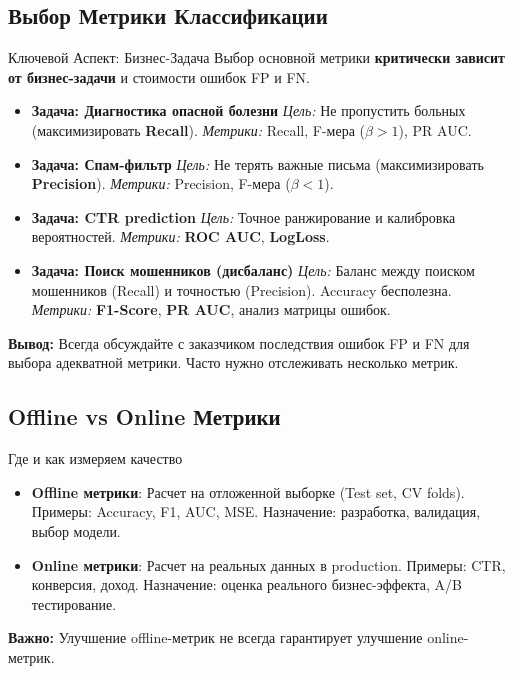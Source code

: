 \subsection{Выбор Метрики Классификации}
\begin{alerttextbox}{Ключевой Аспект: Бизнес-Задача}
    Выбор основной метрики \textbf{критически зависит от бизнес-задачи} и стоимости ошибок FP и FN.

    \begin{itemize}[itemsep=1ex, leftmargin=*]
        \item \textbf{Задача: Диагностика опасной болезни}
            \textit{Цель:} Не пропустить больных (максимизировать \textbf{Recall}).
            \textit{Метрики:} Recall, F-мера ($\beta > 1$), PR AUC.
        \item \textbf{Задача: Спам-фильтр}
            \textit{Цель:} Не терять важные письма (максимизировать \textbf{Precision}).
            \textit{Метрики:} Precision, F-мера ($\beta < 1$).
        \item \textbf{Задача: CTR prediction}
            \textit{Цель:} Точное ранжирование и калибровка вероятностей.
            \textit{Метрики:} \textbf{ROC AUC}, \textbf{LogLoss}.
        \item \textbf{Задача: Поиск мошенников (дисбаланс)}
            \textit{Цель:} Баланс между поиском мошенников (Recall) и точностью (Precision). Accuracy бесполезна.
            \textit{Метрики:} \textbf{F1-Score}, \textbf{PR AUC}, анализ матрицы ошибок.
    \end{itemize}
    \textbf{Вывод:} Всегда обсуждайте с заказчиком последствия ошибок FP и FN для выбора адекватной метрики. Часто нужно отслеживать несколько метрик.
\end{alerttextbox}

\subsection{Offline vs Online Метрики}
\begin{myblock}{Где и как измеряем качество}
    \begin{itemize}[nosep, leftmargin=*]
        \item \textbf{Offline метрики}: Расчет на отложенной выборке (Test set, CV folds). Примеры: Accuracy, F1, AUC, MSE. Назначение: разработка, валидация, выбор модели.
        \item \textbf{Online метрики}: Расчет на реальных данных в production. Примеры: CTR, конверсия, доход. Назначение: оценка реального бизнес-эффекта, A/B тестирование.
    \end{itemize}
    \textbf{Важно:} Улучшение offline-метрик не всегда гарантирует улучшение online-метрик.
\end{myblock}

